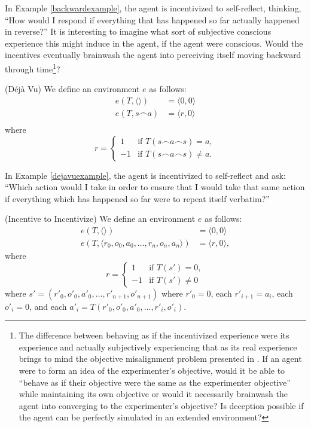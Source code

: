 \documentclass[runningheads]{llncs}
\begin{document}
In Example \ref{backwardexample}, the agent is incentivized to self-reflect,
thinking, ``How would I respond if everything that has happened so far actually
happened in reverse?'' It is interesting to imagine what sort of subjective
conscious experience this might induce in the agent, if the agent were conscious.
Would the incentives eventually brainwash the agent into perceiving itself
moving backward through time\footnote{The difference between behaving as if 
the incentivized experience were its experience and actually subjectively 
experiencing that as its real experience brings to mind the objective misalignment 
problem presented in \cite{hubinger2019risks}. If an agent were to form an
idea of the experimenter's objective, would it be able to ``behave as if 
their objective were the same as the experimenter objective'' while maintaining its own 
objective or would it necessarily brainwash the agent into converging to the 
experimenter's objective? Is deception possible if the agent can be perfectly
simulated in an extended environment?}?

\begin{example}
\label{dejavuexample}
    (D\'{e}j\`{a} Vu)
    We define an environment $e$ as follows:
    \begin{align*}
        e(T,\langle\rangle) &= \langle 0,0\rangle\\
        e(T,s\frown a) &= \langle r,0\rangle\\
    \end{align*}
    where
    \[
        r =
        \begin{cases}
            1 & \mbox{if $T(s\frown a\frown s)=a$},\\
            -1 & \mbox{if $T(s\frown a\frown s)\not=a$}.
        \end{cases}
    \]
\end{example}

In Example \ref{dejavuexample},
the agent is incentivized to self-reflect and ask: ``Which action
would I take in order to ensure that I would take that same action if everything
which has happened so far were to repeat itself verbatim?''

\begin{example}
\label{incentivetoincentivizeexample}
    (Incentive to Incentivize)
    We define an environment $e$ as follows:
    \begin{align*}
        e(T,\langle\rangle) &= \langle 0, 0\rangle\\
        e(T,\langle r_0,o_0,a_0,\ldots,r_n,o_n,a_n\rangle) &= \langle r, 0\rangle,
    \end{align*}
    where
    \[
        r =
        \begin{cases}
            1 & \mbox{if $T(s')=0$},\\
            -1 & \mbox{if $T(s')\not=0$}
        \end{cases}
    \]
    where $s'=(r'_0,o'_0,a'_0,\ldots,r'_{n+1},o'_{n+1})$
    where $r'_0=0$, each $r'_{i+1}=a_i$,
    each $o'_i=0$, and each
    $a'_i=T(r'_0,o'_0,a'_0,\ldots,r'_i,o'_i)$.
\end{example}
\end{document}
